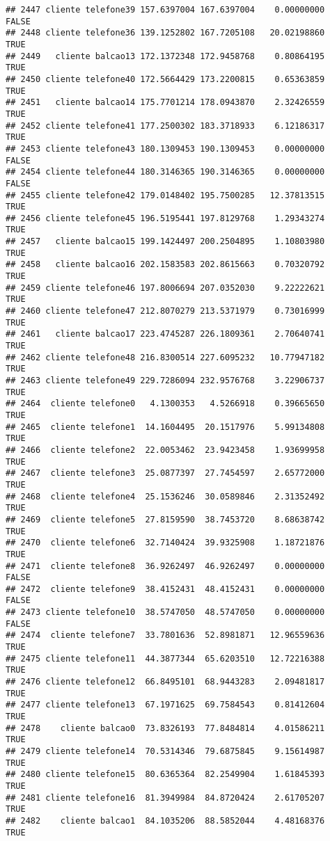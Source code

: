 \documentclass[
]{article}
\begin{document}
\begin{verbatim}
## 2447 cliente telefone39 157.6397004 167.6397004    0.00000000    FALSE
## 2448 cliente telefone36 139.1252802 167.7205108   20.02198860     TRUE
## 2449   cliente balcao13 172.1372348 172.9458768    0.80864195     TRUE
## 2450 cliente telefone40 172.5664429 173.2200815    0.65363859     TRUE
## 2451   cliente balcao14 175.7701214 178.0943870    2.32426559     TRUE
## 2452 cliente telefone41 177.2500302 183.3718933    6.12186317     TRUE
## 2453 cliente telefone43 180.1309453 190.1309453    0.00000000    FALSE
## 2454 cliente telefone44 180.3146365 190.3146365    0.00000000    FALSE
## 2455 cliente telefone42 179.0148402 195.7500285   12.37813515     TRUE
## 2456 cliente telefone45 196.5195441 197.8129768    1.29343274     TRUE
## 2457   cliente balcao15 199.1424497 200.2504895    1.10803980     TRUE
## 2458   cliente balcao16 202.1583583 202.8615663    0.70320792     TRUE
## 2459 cliente telefone46 197.8006694 207.0352030    9.22222621     TRUE
## 2460 cliente telefone47 212.8070279 213.5371979    0.73016999     TRUE
## 2461   cliente balcao17 223.4745287 226.1809361    2.70640741     TRUE
## 2462 cliente telefone48 216.8300514 227.6095232   10.77947182     TRUE
## 2463 cliente telefone49 229.7286094 232.9576768    3.22906737     TRUE
## 2464  cliente telefone0   4.1300353   4.5266918    0.39665650     TRUE
## 2465  cliente telefone1  14.1604495  20.1517976    5.99134808     TRUE
## 2466  cliente telefone2  22.0053462  23.9423458    1.93699958     TRUE
## 2467  cliente telefone3  25.0877397  27.7454597    2.65772000     TRUE
## 2468  cliente telefone4  25.1536246  30.0589846    2.31352492     TRUE
## 2469  cliente telefone5  27.8159590  38.7453720    8.68638742     TRUE
## 2470  cliente telefone6  32.7140424  39.9325908    1.18721876     TRUE
## 2471  cliente telefone8  36.9262497  46.9262497    0.00000000    FALSE
## 2472  cliente telefone9  38.4152431  48.4152431    0.00000000    FALSE
## 2473 cliente telefone10  38.5747050  48.5747050    0.00000000    FALSE
## 2474  cliente telefone7  33.7801636  52.8981871   12.96559636     TRUE
## 2475 cliente telefone11  44.3877344  65.6203510   12.72216388     TRUE
## 2476 cliente telefone12  66.8495101  68.9443283    2.09481817     TRUE
## 2477 cliente telefone13  67.1971625  69.7584543    0.81412604     TRUE
## 2478    cliente balcao0  73.8326193  77.8484814    4.01586211     TRUE
## 2479 cliente telefone14  70.5314346  79.6875845    9.15614987     TRUE
## 2480 cliente telefone15  80.6365364  82.2549904    1.61845393     TRUE
## 2481 cliente telefone16  81.3949984  84.8720424    2.61705207     TRUE
## 2482    cliente balcao1  84.1035206  88.5852044    4.48168376     TRUE

\end{verbatim}
\end{document}
